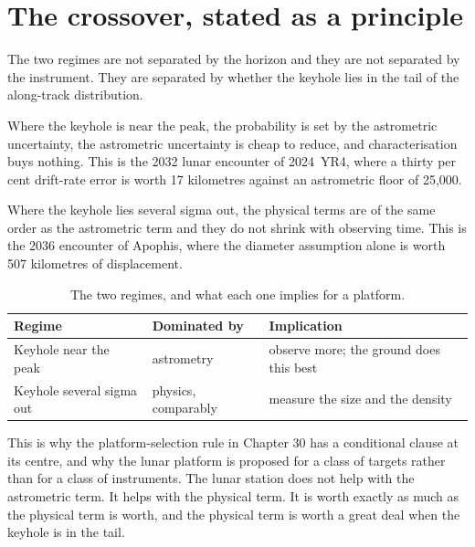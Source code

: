 \section{The crossover, stated as a principle}

The two regimes are not separated by the horizon and they are not separated
by the instrument. They are separated by whether the keyhole lies in the
tail of the along-track distribution.

Where the keyhole is near the peak, the probability is set by the
astrometric uncertainty, the astrometric uncertainty is cheap to reduce, and
characterisation buys nothing. This is the 2032 lunar encounter of
2024~YR4, where a thirty per cent drift-rate error is worth 17 kilometres
against an astrometric floor of 25,000.

Where the keyhole lies several sigma out, the physical terms are of the same
order as the astrometric term and they do not shrink with observing time.
This is the 2036 encounter of Apophis, where the diameter assumption alone is
worth 507 kilometres of displacement.

\begin{table}[!htbp]
\centering
\small
\caption{The two regimes, and what each one implies for a platform.}
\label{tab:regimes}
\begin{tabularx}{\textwidth}{@{}P{1.28in}P{1.28in}Y@{}}
\toprule
{}
\textbf{Regime} & \textbf{Dominated by} & \textbf{Implication} \\
\midrule
Keyhole near the peak & astrometry & observe more; the ground does this
best \\
Keyhole several sigma out & physics, comparably & measure the size and the
density \\
\bottomrule
\end{tabularx}
\end{table}

This is why the platform-selection rule in Chapter 30 has a conditional
clause at its centre, and why the lunar platform is proposed for a class of
targets rather than for a class of instruments. The lunar station does not
help with the astrometric term. It helps with the physical term. It is worth
exactly as much as the physical term is worth, and the physical term is
worth a great deal when the keyhole is in the tail.

